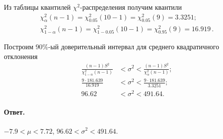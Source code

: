 \noindent
Из таблицы квантилей $\chi^2$-распределения получим квантили
\begin{gather*}
    \chi^2_{\alpha}(n - 1) = \chi^2_{0.05}(10 - 1) = \chi^2_{0.05}(9) = 3.3251;
    \\
    \chi^2_{1 - \alpha}(n - 1) = \chi^2_{1 - 0.05}(10 - 1) = \chi^2_{0.95}(9) = 16.919\,.
\end{gather*}

\noindent
Построим $90\%$-ый доверительный интервал для среднего квадратичного отклонения
\begin{align*}
    \frac{(n-1)S^2}{\chi^2_{1 - \alpha}(n - 1)} &< \sigma^2 < \frac{(n-1)S^2}{\chi^2_{\alpha}(n - 1)};
    \\
    \frac{9 \cdot 181.639}{16.919} &< \sigma^2 < \frac{9 \cdot 181.639}{3.3251};
    \\
    96.62 &< \sigma^2 < 491.64.
\end{align*}

\paragraph{Ответ.} $-7.9 < \mu < 7.72$, $96.62 < \sigma^2 < 491.64$.